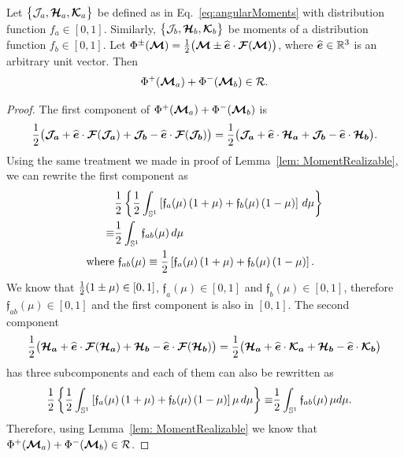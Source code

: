 \begin{lemma}
  Let $\big\{\mathcal{J}_{a},\boldsymbol{\mathcal{H}}_{a},\boldsymbol{\mathcal{K}}_{a}\big\}$ be defined as in Eq.~\eqref{eq:angularMoments} with distribution function $f_{a}\in[0,1]$.  
  Similarly, $\big\{\mathcal{J}_{b},\boldsymbol{\mathcal{H}}_{b},\boldsymbol{\mathcal{K}}_{b}\big\}$ be moments of a distribution function $f_{b}\in[0,1]$.  
  Let $\Phi^{\pm}(\boldsymbol{\mathcal{M}})=\frac{1}{2}\big(\boldsymbol{\mathcal{M}}\pm\widehat{\boldsymbol{e}}\cdot\boldsymbol{\mathcal{F}}(\boldsymbol{\mathcal{M}})\big)$, where $\widehat{\boldsymbol{e}}\in\mathbb{R}^{3}$ is an arbitrary unit vector.  
  Then
  \begin{equation}
    \Phi^{+}(\boldsymbol{\mathcal{M}}_{a})+\Phi^{-}(\boldsymbol{\mathcal{M}}_{b})\in\mathcal{R}.
  \end{equation}
\end{lemma}
\begin{proof}
  The first component of $\Phi^{+}(\boldsymbol{\mathcal{M}}_{a})+\Phi^{-}(\boldsymbol{\mathcal{M}}_{b})$ is
  \begin{equation*} 
    \frac{1}{2}\big(\boldsymbol{\mathcal{J}_{a}} + \widehat{\boldsymbol{e}}\cdot\boldsymbol{\mathcal{F}}(\boldsymbol{\mathcal{J}_{a}})+\boldsymbol{\mathcal{J}_{b}} - \widehat{\boldsymbol{e}}\cdot\boldsymbol{\mathcal{F}}(\boldsymbol{\mathcal{J}_{b}})\big) = \frac{1}{2}\big(\boldsymbol{\mathcal{J}_{a}} + \widehat{\boldsymbol{e}}\cdot\boldsymbol{\mathcal{H}_{a}}+\boldsymbol{\mathcal{J}_{b}} - \widehat{\boldsymbol{e}}\cdot\boldsymbol{\mathcal{H}_{b}}\big).
  \end{equation*}
  Using the same treatment we made in proof of Lemma~\ref{lem: MomentRealizable}, we can rewrite the first component as
  \begin{align*}
  &\frac{1}{2} \left\lbrace \frac{1}{2}\int_{\mathbb{S}^{1}}\left[ \mathfrak{f}_{a}(\mu)\,(1+\mu) + \mathfrak{f}_{b}(\mu)\,(1-\mu)\right] \,d\mu \right\rbrace \\
  \equiv  &\frac{1}{2}\int_{\mathbb{S}^{1}} \mathfrak{f}_{ab}(\mu)\,d\mu \\
  \text{where}&~\mathfrak{f}_{ab}(\mu) \equiv \frac{1}{2}\left[ \mathfrak{f}_{a}(\mu)\,(1+\mu) + \mathfrak{f}_{b}(\mu)\,(1-\mu)\right].
  \end{align*}
  We know that $\frac{1}{2}(1\pm\mu)\in[0,1]$, $\mathfrak{f}_{a}(\mu)\in[0,1]$ and $\mathfrak{f}_{b}(\mu)\in[0,1]$, therefore $\mathfrak{f}_{ab}(\mu)\in[0,1]$ and the first component is also in $[0,1]$.
  The second component
  \begin{equation*} 
    \frac{1}{2}\big(\boldsymbol{\mathcal{H}_{a}} + \widehat{\boldsymbol{e}}\cdot\boldsymbol{\mathcal{F}}(\boldsymbol{\mathcal{H}_{a}})+\boldsymbol{\mathcal{H}_{b}} - \widehat{\boldsymbol{e}}\cdot\boldsymbol{\mathcal{F}}(\boldsymbol{\mathcal{H}_{b}})\big) = \frac{1}{2}\big(\boldsymbol{\mathcal{H}_{a}} + \widehat{\boldsymbol{e}}\cdot\boldsymbol{\mathcal{K}_{a}}+\boldsymbol{\mathcal{H}_{b}} - \widehat{\boldsymbol{e}}\cdot\boldsymbol{\mathcal{K}_{b}}\big)
  \end{equation*}  
  has three subcomponents and each of them can also be rewritten as
  \begin{align*}
    \frac{1}{2} \left\lbrace \frac{1}{2}\int_{\mathbb{S}^{1}}\left[ \mathfrak{f}_{a}(\mu)\,(1+\mu) + \mathfrak{f}_{b}(\mu)\,(1-\mu)\right]\mu \,d\mu \right\rbrace
     \equiv  &\frac{1}{2}\int_{\mathbb{S}^{1}} \mathfrak{f}_{ab}(\mu)\,\mu d\mu. 
  \end{align*}
  Therefore, using Lemma~\ref{lem: MomentRealizable} we know that $\Phi^{+}(\boldsymbol{\mathcal{M}}_{a})+\Phi^{-}(\boldsymbol{\mathcal{M}}_{b})\in\mathcal{R}$.
\end{proof}


